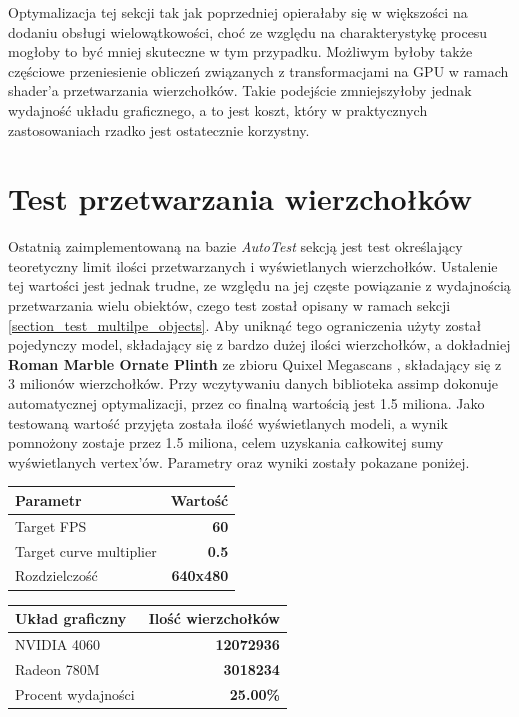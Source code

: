 Optymalizacja tej sekcji tak jak poprzedniej opierałaby się w większości na dodaniu obsługi wielowątkowości, choć ze względu na charakterystykę procesu mogłoby to być mniej skuteczne w tym przypadku. Możliwym byłoby także częściowe przeniesienie obliczeń związanych z transformacjami na GPU w ramach shader'a przetwarzania wierzchołków. Takie podejście zmniejszyłoby jednak wydajność układu graficznego, a to jest koszt, który w praktycznych zastosowaniach rzadko jest ostatecznie korzystny. 

\section{Test przetwarzania wierzchołków}
Ostatnią zaimplementowaną na bazie \textit{AutoTest} sekcją jest test określający teoretyczny limit ilości przetwarzanych i wyświetlanych wierzchołków. Ustalenie tej wartości jest jednak trudne, ze względu na jej częste powiązanie z wydajnością przetwarzania wielu obiektów, czego test został opisany w ramach sekcji \ref{section_test_multilpe_objects}. Aby uniknąć tego ograniczenia użyty został pojedynczy model, składający się z bardzo dużej ilości wierzchołków, a dokładniej \textbf{Roman Marble Ornate Plinth} ze zbioru Quixel Megascans \cite{fab:QuixelMegascans:RomanMarbleOrnatePlinth}, składający się z 3 milionów wierzchołków. Przy wczytywaniu danych biblioteka assimp dokonuje automatycznej optymalizacji, przez co finalną wartością jest 1.5 miliona. Jako testowaną wartość przyjęta została ilość wyświetlanych modeli, a wynik pomnożony zostaje przez 1.5 miliona, celem uzyskania całkowitej sumy wyświetlanych vertex'ów. Parametry oraz wyniki zostały pokazane poniżej.

\begin{center}
	\begin{tabular}{ |l r|}
		\hline
		\textbf{Parametr} & \textbf{Wartość} \\
		\hline
		Target FPS & \textbf{60} \\
		Target curve multiplier & \textbf{0.5} \\
		Rozdzielczość & \textbf{640x480} \\
		\hline
	\end{tabular}
	\quad
	\begin{tabular}{ |l r|}
		\hline
		\textbf{Układ graficzny} & \textbf{Ilość wierzchołków} \\
		\hline
		NVIDIA 4060 & \textbf{12072936} \\
		Radeon 780M & \textbf{3018234} \\
		\hline
		Procent wydajności & \textbf{25.00\%} \\
		\hline
	\end{tabular}
\end{center}


